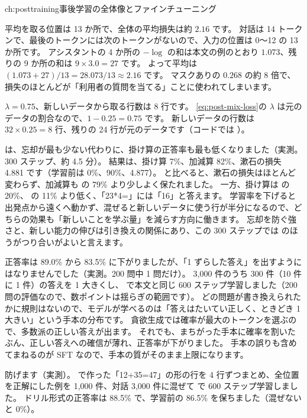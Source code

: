 \begin{answers}{ch:posttraining}{事後学習の全体像とファインチューニング}
\item 平均を取る位置は 13 か所で、全体の平均損失は約 $2.16$ です。
対話は 14 トークンで、最後のトークンには次のトークンがないので、入力の位置は 0〜12 の 13 か所です。
アシスタントの 4 か所の $-\log$ の和は本文の例のとおり $1.073$、残りの 9 か所の和は $9\times3.0=27$ です。
よって平均は $(1.073+27)/13=28.073/13\approx2.16$ です。
マスクありの $0.268$ の約 8 倍で、損失のほとんどが「利用者の質問を当てる」ことに使われてしまいます。
\item $\lambda=0.75$、新しいデータから取る行数は 8 行です。
\eqref{eq:post-mix-loss}の $\lambda$ は元のデータの割合なので、$1-0.25=0.75$ です。
新しいデータの行数は $32\times0.25=8$ 行、残りの 24 行が元のデータです（コードでは ）。
\item {} は、忘却が最も少ない代わりに、掛け算の正答率も最も低くなりました（実測。300 ステップ、約 4.5 分）。
結果は、掛け算 7\%、加減算 82\%、漱石の損失 4.881 です（学習前は 0\%、90\%、4.877）。
と比べると、漱石の損失はほとんど変わらず、加減算も  の 79\% より少しよく保たれました。
一方、掛け算は  の 20\%、 の 11\% より低く、「23*4=」には「16」と答えます。
学習率を下げると出発点から遠くへ動かず、混ぜると新しいデータに使う行が半分になるので、どちらの効果も「新しいことを学ぶ量」を減らす方向に働きます。
忘却を防ぐ強さと、新しい能力の伸びは引き換えの関係にあり、この 300 ステップでは  のほうがつり合いがよいと言えます。
\item 正答率は 89.0\% から 83.5\% に下がりましたが、「1 ずらした答え」を出すようにはなりませんでした（実測。200 問中 1 問だけ）。
3,000 件のうち 300 件（10 件に 1 件）の答えを 1 大きくし、 で本文と同じ 600 ステップ学習しました（200 問の評価なので、数ポイントは揺らぎの範囲です）。
どの問題が書き換えられたかに規則はないので、モデルが学べるのは「答えはたいてい正しく、ときどき 1 大きい」という手本の分布です。
貪欲生成では確率が最大のトークンを選ぶので、多数派の正しい答えが出ます。
それでも、まちがった手本に確率を割いたぶん、正しい答えへの確信が薄れ、正答率が下がりました。
手本の誤りも含めてまねるのが SFT なので、手本の質がそのまま上限になります。
\item 防げます（実測）。
 で作った「12+35=47」の形の行を 4 行ずつまとめ、全位置を正解にした例を 1,000 件、対話 3,000 件に混ぜて  で 600 ステップ学習しました。
ドリル形式の正答率は 88.5\% で、学習前の 86.5\% を保ちました（混ぜないと 0\%）。

\end{answers}
